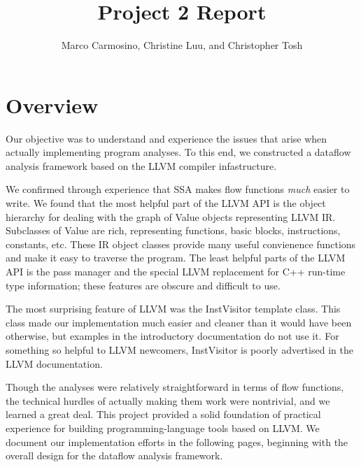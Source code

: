 \documentclass{article}
\title{Project 2 Report}
\author{Marco Carmosino, Christine Luu, and Christopher Tosh}
\theoremstyle{definition}
\begin{document}
\maketitle

\section{Overview}
Our objective was to understand and experience the issues that arise
when actually implementing program analyses. To this end, we
constructed a dataflow analysis framework based on the LLVM compiler
infastructure.

We confirmed through experience that SSA makes flow functions
\emph{much} easier to write. We found that the most helpful part of
the LLVM API is the object hierarchy for dealing with the graph of
Value objects representing LLVM IR. Subclasses of Value are rich,
representing functions, basic blocks, instructions, constants,
etc. These IR object classes provide many useful convienence functions
and make it easy to traverse the program. The least helpful parts of
the LLVM API is the pass manager and the special LLVM replacement for
C++ run-time type information; these features are obscure and
difficult to use.

The most surprising feature of LLVM was the InstVisitor template
class. This class made our implementation much easier and cleaner than
it would have been otherwise, but examples in the introductory
documentation do not use it. For something so helpful to LLVM
newcomers, InstVisitor is poorly advertised in the LLVM documentation.

Though the analyses were relatively straightforward in terms of flow
functions, the technical hurdles of actually making them work were
nontrivial, and we learned a great deal. This project provided a solid
foundation of practical experience for building programming-language
tools based on LLVM. We document our implementation efforts in the
following pages, beginning with the overall design for the dataflow
analysis framework. 
\end{document}
